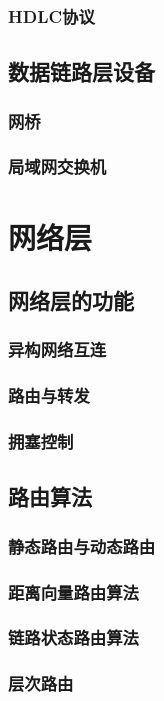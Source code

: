 \documentclass[lang=cn,newtx,10pt,scheme=chinese]{../../elegantbook}
\begin{document}
\subsection{HDLC协议}

\section{数据链路层设备}
\subsection{网桥}
\subsection{局域网交换机}

\chapter{网络层}

\section{网络层的功能}
\subsection{异构网络互连}
\subsection{路由与转发}
\subsection{拥塞控制}

\section{路由算法}
\subsection{静态路由与动态路由}
\subsection{距离向量路由算法}
\subsection{链路状态路由算法}
\subsection{层次路由}
\end{document}
